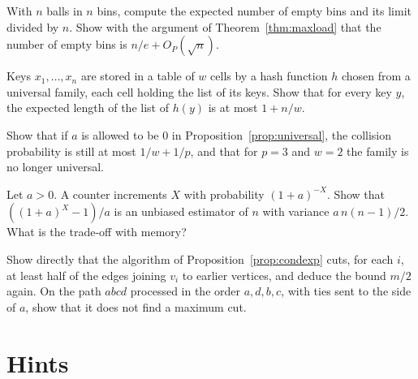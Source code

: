 \begin{exercise}[$\star$]\label{ex:emptybins}
With $n$ balls in $n$ bins, compute the expected number of empty bins and its limit divided by $n$. Show with the argument of Theorem~\ref{thm:maxload} that the number of empty bins is $n/e+O_P(\sqrt n)$.
\end{exercise}

\begin{exercise}[$\star$]\label{ex:hashchain}
Keys $x_1,\dots,x_n$ are stored in a table of $w$ cells by a hash function $h$ chosen from a universal family, each cell holding the list of its keys. Show that for every key $y$, the expected length of the list of $h(y)$ is at most $1+n/w$.
\end{exercise}

\begin{exercise}[$\star$]\label{ex:universalzero}
Show that if $a$ is allowed to be $0$ in Proposition~\ref{prop:universal}, the collision probability is still at most $1/w+1/p$, and that for $p=3$ and $w=2$ the family is no longer universal.
\end{exercise}

\begin{exercise}[$\star\star$]\label{ex:morrisbase}
Let $a>0$. A counter increments $X$ with probability $(1+a)^{-X}$. Show that $((1+a)^X-1)/a$ is an unbiased estimator of $n$ with variance $a\,n(n-1)/2$. What is the trade-off with memory?
\end{exercise}

\begin{exercise}[$\star\star$]\label{ex:maxcutlocal}
Show directly that the algorithm of Proposition~\ref{prop:condexp} cuts, for each $i$, at least half of the edges joining $v_i$ to earlier vertices, and deduce the bound $m/2$ again. On the path $abcd$ processed in the order $a,d,b,c$, with ties sent to the side of $a$, show that it does not find a maximum cut.
\end{exercise}

\section{Hints}

